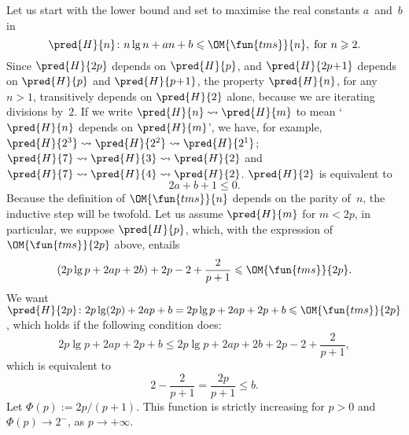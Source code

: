 Let us start with the lower bound and set to maximise the
real constants \(a\)~and~\(b\) in
\begin{equation*}
\pred{H}{n} \colon n\lg n + an + b \leqslant \OM{\fun{tms}}{n},
\; \text{for \(n \geqslant 2\).}
\end{equation*}
Since \(\pred{H}{2p}\) depends on \(\pred{H}{p}\), and
\(\pred{H}{2p\!+\!1}\) depends on \(\pred{H}{p}\) and
\(\pred{H}{p\!+\!1}\), the property \(\pred{H}{n}\), for any \(n>1\),
transitively depends on \(\pred{H}{2}\) alone, because we are
iterating divisions by~\(2\). If we write \(\pred{H}{n} \leadsto
\pred{H}{m}\) to mean `\(\pred{H}{n}\) depends on \(\pred{H}{m}\)', we
have, for example, \(\pred{H}{2^3} \leadsto \pred{H}{2^2} \leadsto
\pred{H}{2^1}\); \(\pred{H}{7} \leadsto \pred{H}{3} \leadsto
\pred{H}{2}\) and \(\pred{H}{7} \leadsto \pred{H}{4} \leadsto
\pred{H}{2}\). \(\pred{H}{2}\) is equivalent to
\begin{equation}
2a + b + 1 \leqslant 0.
\label{ineq:base_lower_Atms}
\end{equation}
Because the definition of \(\OM{\fun{tms}}{n}\) depends on the parity
of~\(n\), the inductive step will be twofold. Let us assume
\(\pred{H}{m}\) for \(m < 2p\), in particular, we suppose
\(\pred{H}{p}\), which, with the expression of \(\OM{\fun{tms}}{2p}\)
above, entails
\begin{equation*}
 (2p\lg p + 2ap + 2b) + 2p - 2 + \frac{2}{p+1} \leqslant \OM{\fun{tms}}{2p}.
\end{equation*}
We want \(\pred{H}{2p} \colon 2p\lg(2p) + 2ap + b
= 2p\lg p + 2ap + 2p + b \leqslant \OM{\fun{tms}}{2p}\), which holds
if the following condition does:
\begin{equation*}
2p\lg p + 2ap + 2p + b \leqslant 2p\lg p + 2ap + 2b + 2p - 2 + \frac{2}{p+1},
\end{equation*}
which is equivalent to
\begin{equation*}
2 - \frac{2}{p+1} = \frac{2p}{p+1} \leqslant b.
\end{equation*}
Let \(\Phi(p) := 2p/(p+1)\). This function is strictly increasing for
\(p > 0\) and \(\Phi(p) \to 2^{-}\), as \(p \to +\infty\).


